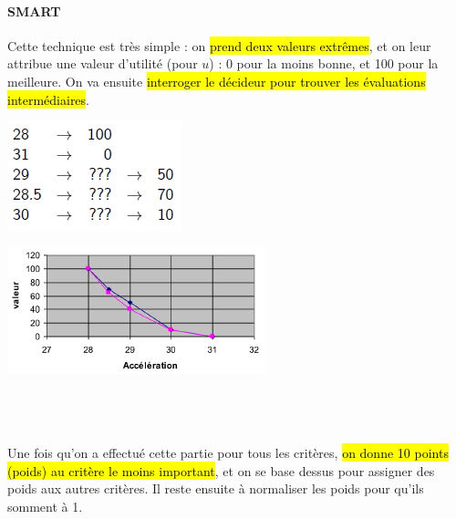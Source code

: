 \documentclass[a4paper, 12pt]{article}
\newcommand{\alinea}{
\hspace*{0.5cm}}
\begin{document}
			\paragraph{SMART}
				\alinea Cette technique est très simple : on \hl{prend deux valeurs extrêmes}, et on leur attribue une valeur 
					d'utilité (pour $u$) : 0 pour la moins bonne, et 100 pour la meilleure. On va ensuite \hl{interroger le 
					décideur pour trouver les évaluations intermédiaires}. \\
				\begin{minipage}{0.33\textwidth}
					\includegraphics[width=\textwidth]{Images/smart1}
				\end{minipage}\hfill
				\begin{minipage}{0.575\textwidth}
					\includegraphics[width=\textwidth]{Images/smart2}
				\end{minipage}~\\~\\~\\
				\alinea Une fois qu'on a effectué cette partie pour tous les critères, \hl{on donne 10 points (poids) au critère le moins
					important}, et on se base dessus pour assigner des poids aux autres critères. Il reste ensuite à normaliser
					les poids pour qu'ils somment à 1.
\end{document}
